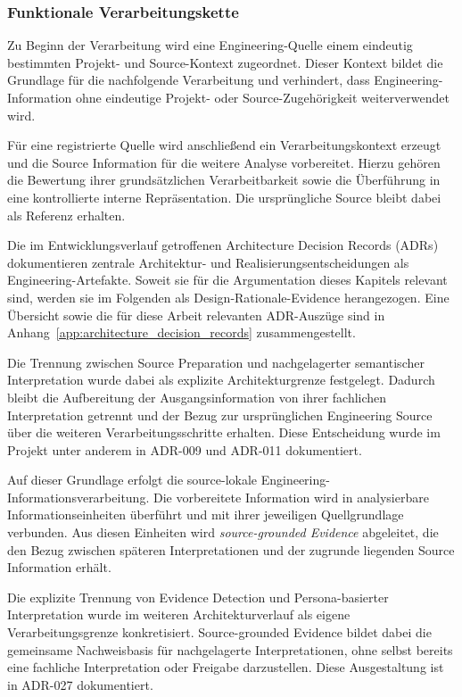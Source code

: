 \subsubsection{Funktionale Verarbeitungskette}
\label{sec:funktionale_verarbeitungskette}

Zu Beginn der Verarbeitung wird eine Engineering-Quelle einem eindeutig
bestimmten Projekt- und Source-Kontext zugeordnet. Dieser Kontext bildet die
Grundlage für die nachfolgende Verarbeitung und verhindert, dass
Engineering-Information ohne eindeutige Projekt- oder Source-Zugehörigkeit
weiterverwendet wird.

Für eine registrierte Quelle wird anschließend ein Verarbeitungskontext
erzeugt und die Source Information für die weitere Analyse vorbereitet.
Hierzu gehören die Bewertung ihrer grundsätzlichen Verarbeitbarkeit sowie die
Überführung in eine kontrollierte interne Repräsentation. Die ursprüngliche
Source bleibt dabei als Referenz erhalten.

Die im Entwicklungsverlauf getroffenen Architecture Decision Records (ADRs)
dokumentieren zentrale Architektur- und Realisierungsentscheidungen als
Engineering-Artefakte. Soweit sie für die Argumentation dieses Kapitels
relevant sind, werden sie im Folgenden als Design-Rationale-Evidence
herangezogen. Eine Übersicht sowie die für diese Arbeit relevanten ADR-Auszüge
sind in Anhang~\ref{app:architecture_decision_records} zusammengestellt.

Die Trennung zwischen Source Preparation und nachgelagerter semantischer
Interpretation wurde dabei als explizite Architekturgrenze festgelegt.
Dadurch bleibt die Aufbereitung der Ausgangsinformation von ihrer fachlichen
Interpretation getrennt und der Bezug zur ursprünglichen Engineering Source
über die weiteren Verarbeitungsschritte erhalten. Diese Entscheidung wurde
im Projekt unter anderem in ADR-009 und ADR-011 dokumentiert.

Auf dieser Grundlage erfolgt die source-lokale
Engineering-Informationsverarbeitung. Die vorbereitete Information wird in
analysierbare Informationseinheiten überführt und mit ihrer jeweiligen
Quellgrundlage verbunden. Aus diesen Einheiten wird
\emph{source-grounded Evidence} abgeleitet, die den Bezug zwischen späteren
Interpretationen und der zugrunde liegenden Source Information erhält.

Die explizite Trennung von Evidence Detection und Persona-basierter
Interpretation wurde im weiteren Architekturverlauf als eigene
Verarbeitungsgrenze konkretisiert. Source-grounded Evidence bildet dabei die
gemeinsame Nachweisbasis für nachgelagerte Interpretationen, ohne selbst bereits
eine fachliche Interpretation oder Freigabe darzustellen. Diese Ausgestaltung
ist in ADR-027 dokumentiert.

